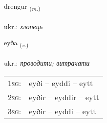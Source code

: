 \documentclass[frontgrid, backgrid]{flacards}\usepackage[]{graphicx}\usepackage[]{xcolor}
\begin{document}
\renewcommand{\blhead}{\vskip5pt {\small\bfseries\footnotesize Nafnorð | іменник }}
\renewcommand{\bcfoot}{\vskip5pt \hspace{2pt}{\small\bfseries\footnotesize 1K}}


{drengur \small{\textsubscript{(\textit{m.})}} \\[1ex] %
\textphonetic{[treiŋkʏr]} \\
ukr.: \emph{хлопець} \\  [2ex]
\renewcommand*{\arraystretch}{0.8}
}

\renewcommand{\flhead}{\vskip5pt \fboxsep=0pt {\small\bfseries\footnotesize Sagnorð | дієслово}}
\renewcommand{\fcfoot}{\vskip5pt \fboxsep=0pt \hspace{2pt}{\small\bfseries\footnotesize 1K}}

\renewcommand{\blhead}{\vskip5pt {\small\bfseries\footnotesize Sagnorð | дієслово }}
\renewcommand{\bcfoot}{\vskip5pt \hspace{2pt}{\small\bfseries\footnotesize 1K}}


{eyða \small{\textsubscript{(\textit{v.})}} \\[1ex] %
\textphonetic{[eiːða]} \\
ukr.: \emph{проводити; витрачати} \\  [2ex]
\renewcommand*{\arraystretch}{0.8}
\begin{tabular}{p{1cm}l}
\textsc{1sg}: & eyði -- eyddi -- eytt \\ 
\textsc{2sg}: & eyðir -- eyddir -- eytt \\ 
\textsc{3sg}: & eyðir -- eyddi -- eytt \\ 
\end{tabular}
}

\renewcommand{\flhead}{\vskip5pt \fboxsep=0pt {\small\bfseries\footnotesize Sagnorð | дієслово}}
\renewcommand{\fcfoot}{\vskip5pt \fboxsep=0pt \hspace{2pt}{\small\bfseries\footnotesize 1K}}
\end{document}
